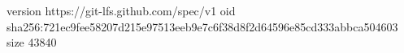 version https://git-lfs.github.com/spec/v1
oid sha256:721ec9fee58207d215e97513eeb9e7c6f38d8f2d64596e85cd333abbca504603
size 43840
